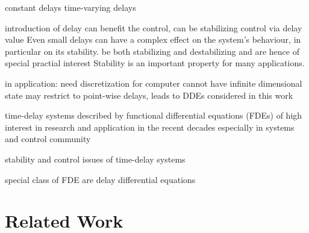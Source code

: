     constant delays
    time-varying delays

    introduction of delay can benefit the control, can be stabilizing
    control via delay value
    Even small delays can have a complex effect on the system's behaviour, in particular on its stability.
    be both stabilizing and destabilizing
    and are hence of special practial interest
    Stability is an important property for many applications.

    in application: need discretization for computer
    cannot have infinite dimensional state
    may restrict to point-wise delays, leads to DDEs considered in this work


    \cite{Gu03TimeDelaySys} %
    time-delay systems
    described by functional differential equations (FDEs)
    of high interest in research and application in the recent decades
    especially in systems and control community

    stability and control issues of time-delay systems

    special class of FDE are delay differential equations


	\section{Related Work}
	\cite{Huang16BoundedVerificationNNDS}